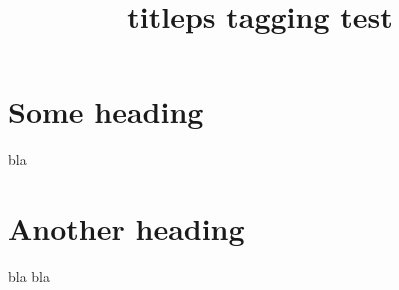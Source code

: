 \documentclass{article}
\title{titleps tagging test}
\begin{document}
\section{Some heading}
bla

\newpage

\section{Another heading}
bla bla
\end{document}
